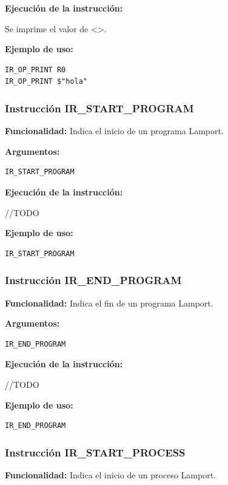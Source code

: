\noindent
\textbf{Ejecución de la instrucción:}
\vspace{0.3cm}

\noindent
Se imprime el valor de <>.
\vspace{0.3cm}

\noindent
\textbf{Ejemplo de uso:}
\begin{verbatim}
IR_OP_PRINT R0
IR_OP_PRINT $"hola"
\end{verbatim}


\subsubsection{Instrucción IR\_START\_PROGRAM}\label{subsubsec:IR_START_PROGRAM}
\noindent
\textbf{Funcionalidad:} Indica el inicio de un programa Lamport.

\noindent
\textbf{Argumentos:}
\begin{verbatim}
IR_START_PROGRAM
\end{verbatim}

\noindent
\textbf{Ejecución de la instrucción:}
\vspace{0.3cm}

\noindent
//TODO
\vspace{0.3cm}

\noindent
\textbf{Ejemplo de uso:}
\begin{verbatim}
IR_START_PROGRAM
\end{verbatim}

\subsubsection{Instrucción IR\_END\_PROGRAM}\label{subsubsec:IR_END_PROGRAM}
\noindent
\textbf{Funcionalidad:} Indica el fin de un programa Lamport.

\noindent
\textbf{Argumentos:}
\begin{verbatim}
IR_END_PROGRAM
\end{verbatim}

\noindent
\textbf{Ejecución de la instrucción:}
\vspace{0.3cm}

\noindent
//TODO
\vspace{0.3cm}

\noindent
\textbf{Ejemplo de uso:}
\begin{verbatim}
IR_END_PROGRAM
\end{verbatim}

\subsubsection{Instrucción IR\_START\_PROCESS}\label{subsubsec:IR_START_PROCESS}
\noindent
\textbf{Funcionalidad:} Indica el inicio de un proceso Lamport.

